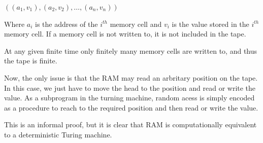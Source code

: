 \documentclass[11pt]{article}
\begin{document}
$((a_1, v_1), (a_2, v_2), \ldots, (a_n, v_n))$

Where $a_i$ is the address of the $i^{th}$ memory cell and $v_i$ is the value stored in the $i^{th}$ memory cell. If a memory cell is not written to, it is not included in the tape.

At any given finite time only finitely many memory cells are written to, and thus the tape is finite.

Now, the only issue is that the RAM may read an arbritary position on the tape. In this case, we just have to move the head to the position and read or write the value. As a subprogram in the turning machine, random acess is simply encoded as a procedure to reach to the required position and then read or write the value.

This is an informal proof, but it is clear that RAM is computationally equivalent to a deterministic Turing machine.
\end{document}
